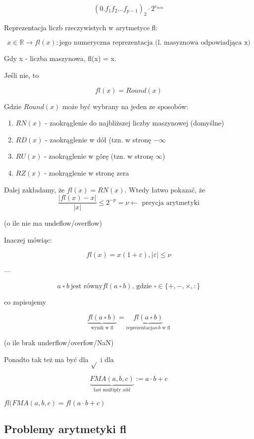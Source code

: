 \documentclass[hidelinks,a4paper]{article}
\begin{document}
\[
	(0.f_1f_2...f_{p-1})_2 \cdot 2^{e_{min}}
\]

Reprezentacja liczb rzeczywistych w arytmetyce fl:

\[
	x \in \mathbb{R} \rightarrow fl(x) : \textrm{jego numeryczna reprezentacja (l. masyznowa odpowiadjąca x)}
\]

Gdy x - liczba maszynowa, fl(x) = x.

Jeśli nie, to

\[
	fl(x) = Round(x)
\]

Gdzie $Round(x)$ może być wybrany na jeden ze sposobów:

\begin{enumerate}
	\item $RN(x)$ - zaokrąglenie do najbliższej liczby maszynowej (domyślne)
	\item $RD(x)$ - zaokrąglenie w dół (tzn. w stronę $-\infty$
	\item $RU(x)$ - zaokrąglenie w górę (tzn. w stronę $\infty$)
	\item $RZ(x)$ - zaokrąglenie w stronę zera
\end{enumerate}

Dalej zakładamy, że $fl(x) = RN(x)$. Wtedy łatwo pokazać, że 
\[
	\frac{|fl(x) - x|}{|x|} \leq 2^{-p} = \nu \leftarrow \textrm{ preycja arytmetyki}
\]

(o ile nie ma undeflow/overflow)

Inaczej mówiąc:

\[
	fl(x) = x(1 + \varepsilon), |\varepsilon| \leq \nu
\]

---

\[
	a\ \square\ b\ \textrm{jest równy} fl(a\ \square\ b)\textrm{, gdzie }\square \in \{+, -, \times, :\}
\]

co zapisujemy

\[
	\underbrace{fl(a\ \square\ b)}_{\textrm{wynik w fl}} = \underbrace{fl(a\ \square\ b)}_{\textrm{reprezentacja} a \square b \textrm{ w fl}}
\]

(o ile brak underflow/overfow/NaN)

Ponadto tak też ma być dla $\sqrt{}$ i dla

\[
	\underbrace{FMA(a, b, c)}_{\textrm{fast multiply add}} := a \cdot b + c
\]

$fl(FMA(a, b, c) = fl(a \cdot b + c)$

\subsection{Problemy arytmetyki fl}
\end{document}
